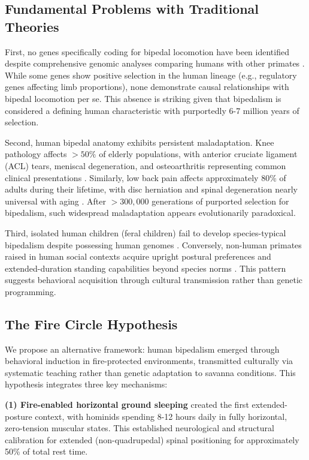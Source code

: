 \documentclass[12pt,a4paper]{article}
\begin{document}
\subsection{Fundamental Problems with Traditional Theories}

First, no genes specifically coding for bipedal locomotion have been identified despite comprehensive genomic analyses comparing humans with other primates \citep{varki2008comparing,prado-martinez2013great}. While some genes show positive selection in the human lineage (e.g., regulatory genes affecting limb proportions), none demonstrate causal relationships with bipedal locomotion per se. This absence is striking given that bipedalism is considered a defining human characteristic with purportedly 6-7 million years of selection.

Second, human bipedal anatomy exhibits persistent maladaptation. Knee pathology affects $>50\%$ of elderly populations, with anterior cruciate ligament (ACL) tears, meniscal degeneration, and osteoarthritis representing common clinical presentations \citep{lohmander2007high,zhang2010prevalence}. Similarly, low back pain affects approximately 80\% of adults during their lifetime, with disc herniation and spinal degeneration nearly universal with aging \citep{hoy2012global}. After $>300,000$ generations of purported selection for bipedalism, such widespread maladaptation appears evolutionarily paradoxical.

Third, isolated human children (feral children) fail to develop species-typical bipedalism despite possessing human genomes \citep{curtiss1977genie,lane1976wild}. Conversely, non-human primates raised in human social contexts acquire upright postural preferences and extended-duration standing capabilities beyond species norms \citep{patterson1978linguistic,savage-rumbaugh1998apes}. This pattern suggests behavioral acquisition through cultural transmission rather than genetic programming.

\subsection{The Fire Circle Hypothesis}

We propose an alternative framework: human bipedalism emerged through behavioral induction in fire-protected environments, transmitted culturally via systematic teaching rather than genetic adaptation to savanna conditions. This hypothesis integrates three key mechanisms:

\textbf{(1) Fire-enabled horizontal ground sleeping} created the first extended-posture context, with hominids spending 8-12 hours daily in fully horizontal, zero-tension muscular states. This established neurological and structural calibration for extended (non-quadrupedal) spinal positioning for approximately 50\% of total rest time.
\end{document}
